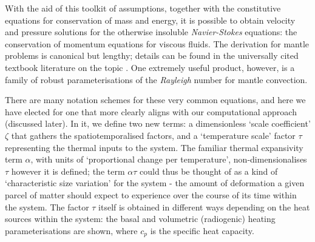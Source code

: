 \documentclass[a4paper,11pt,oneside]{book}
\begin{document}
With the aid of this toolkit of assumptions, together with the constitutive equations for conservation of mass and energy, it is possible to obtain velocity and pressure solutions for the otherwise insoluble \textit{Navier-Stokes} equations: the conservation of momentum equations for viscous fluids. The derivation for mantle problems is canonical but lengthy; details can be found in the universally cited textbook literature on the topic \citet{Schubert2001-ea, Turcotte2014-by}. One extremely useful product, however, is a family of robust parameterisations of the \textit{Rayleigh} number for mantle convection.

There are many notation schemes for these very common equations, and here we have elected for one that more clearly aligns with our computational approach (discussed later). In it, we define two new terms: a dimensionless `scale coefficient' $\zeta$ that gathers the spatiotemporalised factors, and a `temperature scale' factor $\tau$ representing the thermal inputs to the system. The familiar thermal expansivity term $\alpha$, with units of `proportional change per temperature', non-dimensionalises $\tau$ however it is defined; the term $\alpha \tau$ could thus be thought of as a kind of `characteristic size variation' for the system - the amount of deformation a given parcel of matter should expect to experience over the course of its time within the system. The factor $\tau$ itself is obtained in different ways depending on the heat sources within the system: the basal and volumetric (radiogenic) heating parameterisations are shown, where $c_p$ is the specific heat capacity.
\end{document}
